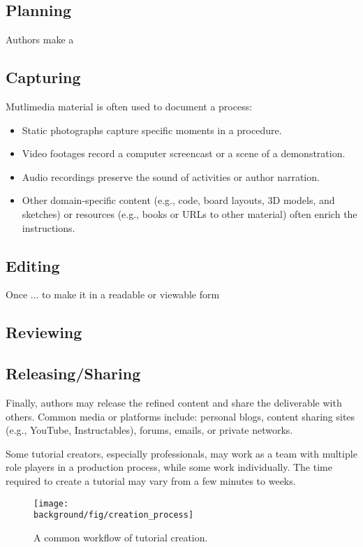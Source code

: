\subsection{Planning}
Authors make a

\subsection{Capturing}
Mutlimedia material is often used to document a process:
\begin{itemize}
  \itemsep -2pt
  \item Static photographs capture specific moments in a procedure.
  \item Video footages record a computer screencast or a scene of a demonstration.
  \item Audio recordings preserve the sound of activities or author narration.
  \item Other domain-specific content (e.g., code, board layouts, 3D models, and sketches) or resources (e.g., books or URLs to other material) often enrich the instructions.
\end{itemize}

\subsection{Editing}
Once ... to make it in a readable or viewable form

\subsection{Reviewing}

\subsection{Releasing/Sharing}
Finally, authors may release the refined content and share the deliverable with others. Common media or platforms include: personal blogs, content sharing sites (e.g., YouTube, Instructables), forums, emails, or private networks.

Some tutorial creators, especially professionals, may work as a team with multiple role players in a production process, while some work individually. The time required to create a tutorial may vary from a few minutes to weeks.

\begin{figure*}[t]
  \centering
  \texttt{[image: \\background/fig/creation\_process]}
  \caption{A common workflow of tutorial creation. }
  \label{fig:background_creation}
\end{figure*}
